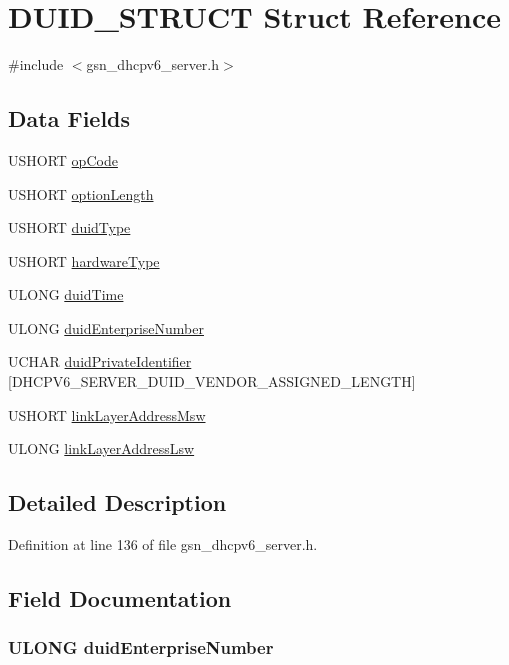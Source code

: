 \hypertarget{a00017}{
\section{DUID\_\-STRUCT Struct Reference}
\label{a00017}
}


{\ttfamily \#include $<$gsn\_\-dhcpv6\_\-server.h$>$}

\subsection*{Data Fields}
\begin{DoxyCompactItemize}
\item 
USHORT \hyperlink{a00017_a5684d9b2c9f50a37e51b1aa5d8b40253}{opCode}
\item 
USHORT \hyperlink{a00017_af8eb97ea691a72b882685220fe0f841d}{optionLength}
\item 
USHORT \hyperlink{a00017_af3a4a7f1db422f485d83bdaec4f92640}{duidType}
\item 
USHORT \hyperlink{a00017_a1dc99d073ea18e394b2daeb98968afc6}{hardwareType}
\item 
ULONG \hyperlink{a00017_ae5c28529de50ed9745a98614305a42a2}{duidTime}
\item 
ULONG \hyperlink{a00017_a81990326750939b9d6700883cc7deb90}{duidEnterpriseNumber}
\item 
UCHAR \hyperlink{a00017_a4f3cc9f4ebb747c6f04a6e4de81f73b7}{duidPrivateIdentifier} \mbox{[}DHCPV6\_\-SERVER\_\-DUID\_\-VENDOR\_\-ASSIGNED\_\-LENGTH\mbox{]}
\item 
USHORT \hyperlink{a00017_ae610244356ee6712be8d75d96eddeb5b}{linkLayerAddressMsw}
\item 
ULONG \hyperlink{a00017_a50be144cd28d35d01e6e3a0e39e76636}{linkLayerAddressLsw}
\end{DoxyCompactItemize}


\subsection{Detailed Description}


Definition at line 136 of file gsn\_\-dhcpv6\_\-server.h.



\subsection{Field Documentation}
\hypertarget{a00017_a81990326750939b9d6700883cc7deb90}{
\subsubsection[{duidEnterpriseNumber}]{\setlength{\rightskip}{0pt plus 5cm}ULONG {\bf duidEnterpriseNumber}}}
\label{a00017_a81990326750939b9d6700883cc7deb90}


